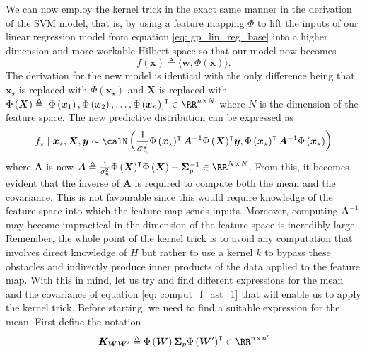 We can now employ the kernel trick in the exact same manner in the derivation of the SVM model, that is, by using a feature mapping $\Phi$ to lift the inputs of our linear regression model from equation \ref{eq: gp_lin_reg_base} into a higher dimension and more workable Hilbert space so that our model now becomes
\begin{equation*} \label{eq: gp_lin_reg_feat_map}
    f \left( \bm{x} \right) \triangleq \langle \bm{w} , \Phi \left( \bm{x} \right) \rangle.
\end{equation*}
The derivation for the new model is identical with the only difference being that $\bm{x}_{\star}$ is replaced with $\Phi \left( \bm{x}_{\star} \right)$ and $\bm{X}$ is replaced with $\Phi \left( \bm{X} \right) \triangleq \left[ \Phi \left( \bm{x}_1 \right), \Phi \left( \bm{x}_2 \right) , \ldots , \Phi \left( \bm{x}_n \right) \right]^{\intercal} \in \RR^{n \times N}$ where $N$ is the dimension of the feature space. The new predictive distribution can be expressed as
\begin{equation} \label{eq: comput_f_ast_1}
    f_{\star} \mid \bm{x}_{\star} , \bm{X} , \bm{y} \sim \calN \left( \frac{1}{\sigma_n^2} \Phi \left( \bm{x}_{\star} \right)^{\intercal} \bm{A}^{-1} {\Phi \left( \bm{X} \right)}^{\intercal} \bm{y} , \Phi \left( \bm{x}_{\star} \right)^{\intercal} \bm{A}^{-1} \Phi \left( \bm{x}_{\star} \right) \right)
\end{equation}
where $\bm{A}$ is now $\bm{A} \triangleq \frac{1}{\sigma_n^2} {\Phi \left( \bm{X} \right)}^{\intercal} \Phi \left( \bm{X} \right) + \bm{\Sigma}_p^{-1} \in \RR^{N \times N}$. From this, it becomes evident that the inverse of $\bm{A}$ is required to compute both the mean and the covariance. This is not favourable since this would require knowledge of the feature space into which the feature map sends inputs. Moreover, computing $\bm{A}^{-1}$ may become impractical in the dimension of the feature space is incredibly large. Remember, the whole point of the kernel trick is to avoid any computation that involves direct knowledge of $H$ but rather to use a kernel $k$ to bypass these obstacles and indirectly produce inner products of the data applied to the feature map. With this in mind, let us try and find different expressions for the mean and the covariance of equation \ref{eq: comput_f_ast_1} that will enable us to apply the kernel trick. Before starting, we need to find a suitable expression for the mean. First define the notation
\[
    \bm{K}_{\bm{W} \bm{W}'} \triangleq \Phi \left( \bm{W} \right) \bm{\Sigma}_p {\Phi \left( \bm{W}' \right)}^{\intercal} \in \RR^{n \times n'}
\]
